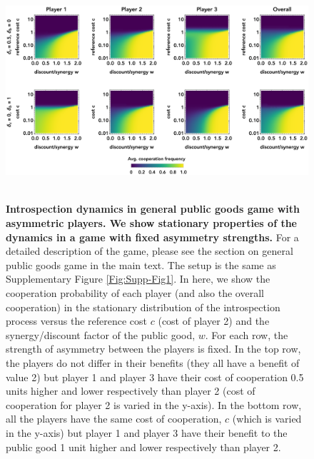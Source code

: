\documentclass[11pt]{article}
\theoremstyle{plainCl1}
\theoremstyle{plainCl2}
\begin{document}
\begin{figure}
\centering
\includegraphics[width =  \textwidth]{figures/Supfigure2.eps}~\\[0.4cm]
\caption{\onehalfspacing
\textbf{Introspection dynamics in general public goods game with asymmetric players. We show stationary properties of the dynamics in a game with fixed asymmetry strengths.} For a detailed description of the game, please see the section on general public goods game in the main text. The setup is the same as Supplementary Figure \ref{Fig:Supp-Fig1}. In here, we show the cooperation probability of each player (and also the overall cooperation) in the stationary distribution of the introspection process versus the reference cost $c$ (cost of player 2) and the synergy/discount factor of the public good, $w$. For each row, the strength of asymmetry between the players is fixed. In the top row, the players do not differ in their benefits (they all have a benefit of value 2) but player 1 and player 3 have their cost of cooperation 0.5 units higher and lower respectively than player 2 (cost of cooperation for player 2 is varied in the y-axis). In the bottom row, all the players have the same cost of cooperation, $c$ (which is varied in the y-axis) but player 1 and player 3 have their benefit to the public good 1 unit higher and lower respectively than player 2.
}
\label{Fig:Supp-Fig2}
\end{figure}
\end{document}
